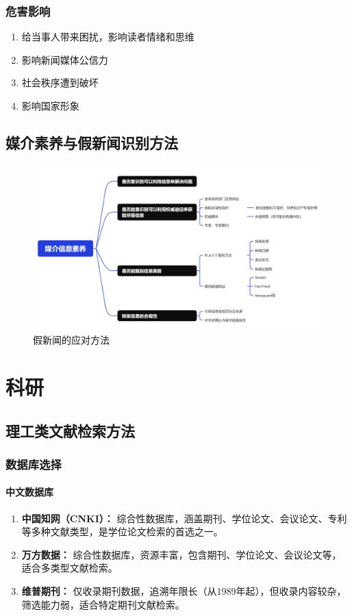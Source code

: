 \documentclass{amznotes}
\begin{document}
\subsection{危害影响}
\begin{enumerate}
  \item 给当事人带来困扰，影响读者情绪和思维
  \item 影响新闻媒体公信力
  \item 社会秩序遭到破坏
  \item 影响国家形象
\end{enumerate}
\section{媒介素养与假新闻识别方法}
\begin{figure}[H]
  \centering
  \includegraphics[width=\textwidth]{./figures/假新闻/思维导图.png}
  \caption{假新闻的应对方法}
\end{figure}
\chapter{科研}
\section{理工类文献检索方法}\label{数据库}
\subsection{数据库选择}

\subsubsection{中文数据库}

\begin{enumerate}
  \item \textbf{中国知网（CNKI）：} 综合性数据库，涵盖期刊、学位论文、会议论文、专利等多种文献类型，是学位论文检索的首选之一。
  \item \textbf{万方数据：} 综合性数据库，资源丰富，包含期刊、学位论文、会议论文等，适合多类型文献检索。
  \item \textbf{维普期刊：} 仅收录期刊数据，追溯年限长（从1989年起），但收录内容较杂，筛选能力弱，适合特定期刊文献检索。
\end{enumerate}
\end{document}
